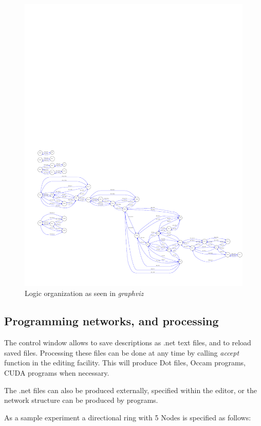 \documentclass[times,a4paper]{book}
\begin{document}
\begin{figure}[hbtp]
\begin{center} 
\includegraphics[width=12cm]{genRange100Points40-rogne.pdf}
\caption{Logic organization as seen in {\sl graphviz}}
\label{fig:genRange100Points40-rogne}
\end{center}
\end{figure}
 

\subsection{Programming networks, and processing}
\label{sec:ring5Def}
The control window allows to save descriptions as .net text files, and to reload saved files.
Processing these files can be done at any time by calling {\sl accept} function in 
the editing facility. This will produce Dot files, Occam programs, CUDA programs
when necessary.

The .net files can also be produced externally, specified within the editor, or the network structure
can be produced by programs. 

As a sample experiment  a directional ring with 5 Nodes is specified as follows:
\end{document}
